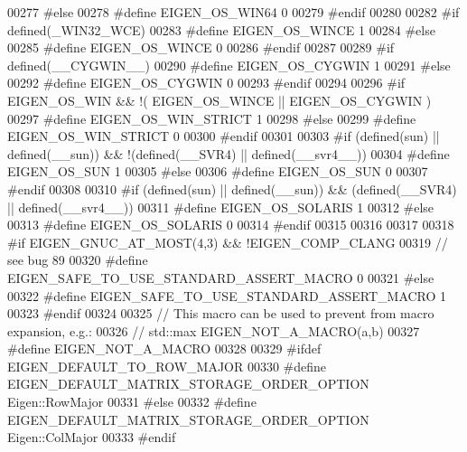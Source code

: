 \begin{DoxyCode}
00277 \textcolor{preprocessor}{#else}
00278 \textcolor{preprocessor}{  #define EIGEN\_OS\_WIN64 0}
00279 \textcolor{preprocessor}{#endif}
00280 
00282 \textcolor{preprocessor}{#if defined(\_WIN32\_WCE)}
00283 \textcolor{preprocessor}{  #define EIGEN\_OS\_WINCE 1}
00284 \textcolor{preprocessor}{#else}
00285 \textcolor{preprocessor}{  #define EIGEN\_OS\_WINCE 0}
00286 \textcolor{preprocessor}{#endif}
00287 
00289 \textcolor{preprocessor}{#if defined(\_\_CYGWIN\_\_)}
00290 \textcolor{preprocessor}{  #define EIGEN\_OS\_CYGWIN 1}
00291 \textcolor{preprocessor}{#else}
00292 \textcolor{preprocessor}{  #define EIGEN\_OS\_CYGWIN 0}
00293 \textcolor{preprocessor}{#endif}
00294 
00296 \textcolor{preprocessor}{#if EIGEN\_OS\_WIN && !( EIGEN\_OS\_WINCE || EIGEN\_OS\_CYGWIN )}
00297 \textcolor{preprocessor}{  #define EIGEN\_OS\_WIN\_STRICT 1}
00298 \textcolor{preprocessor}{#else}
00299 \textcolor{preprocessor}{  #define EIGEN\_OS\_WIN\_STRICT 0}
00300 \textcolor{preprocessor}{#endif}
00301 
00303 \textcolor{preprocessor}{#if (defined(sun) || defined(\_\_sun)) && !(defined(\_\_SVR4) || defined(\_\_svr4\_\_))}
00304 \textcolor{preprocessor}{  #define EIGEN\_OS\_SUN 1}
00305 \textcolor{preprocessor}{#else}
00306 \textcolor{preprocessor}{  #define EIGEN\_OS\_SUN 0}
00307 \textcolor{preprocessor}{#endif}
00308 
00310 \textcolor{preprocessor}{#if (defined(sun) || defined(\_\_sun)) && (defined(\_\_SVR4) || defined(\_\_svr4\_\_))}
00311 \textcolor{preprocessor}{  #define EIGEN\_OS\_SOLARIS 1}
00312 \textcolor{preprocessor}{#else}
00313 \textcolor{preprocessor}{  #define EIGEN\_OS\_SOLARIS 0}
00314 \textcolor{preprocessor}{#endif}
00315 
00316 
00317 
00318 \textcolor{preprocessor}{#if EIGEN\_GNUC\_AT\_MOST(4,3) && !EIGEN\_COMP\_CLANG}
00319   \textcolor{comment}{// see bug 89}
00320 \textcolor{preprocessor}{  #define EIGEN\_SAFE\_TO\_USE\_STANDARD\_ASSERT\_MACRO 0}
00321 \textcolor{preprocessor}{#else}
00322 \textcolor{preprocessor}{  #define EIGEN\_SAFE\_TO\_USE\_STANDARD\_ASSERT\_MACRO 1}
00323 \textcolor{preprocessor}{#endif}
00324 
00325 \textcolor{comment}{// This macro can be used to prevent from macro expansion, e.g.:}
00326 \textcolor{comment}{//   std::max EIGEN\_NOT\_A\_MACRO(a,b)}
00327 \textcolor{preprocessor}{#define EIGEN\_NOT\_A\_MACRO}
00328 
00329 \textcolor{preprocessor}{#ifdef EIGEN\_DEFAULT\_TO\_ROW\_MAJOR}
00330 \textcolor{preprocessor}{#define EIGEN\_DEFAULT\_MATRIX\_STORAGE\_ORDER\_OPTION Eigen::RowMajor}
00331 \textcolor{preprocessor}{#else}
00332 \textcolor{preprocessor}{#define EIGEN\_DEFAULT\_MATRIX\_STORAGE\_ORDER\_OPTION Eigen::ColMajor}
00333 \textcolor{preprocessor}{#endif}

\end{DoxyCode}
